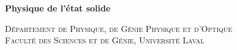 %
\begin{center}
    \textbf{\large{Physique de l'état solide}}\par
    \textsc{Département de Physique, de Génie Physique et d'Optique\\
    Faculté des Sciences et de Génie, Université Laval}\par
\end{center}